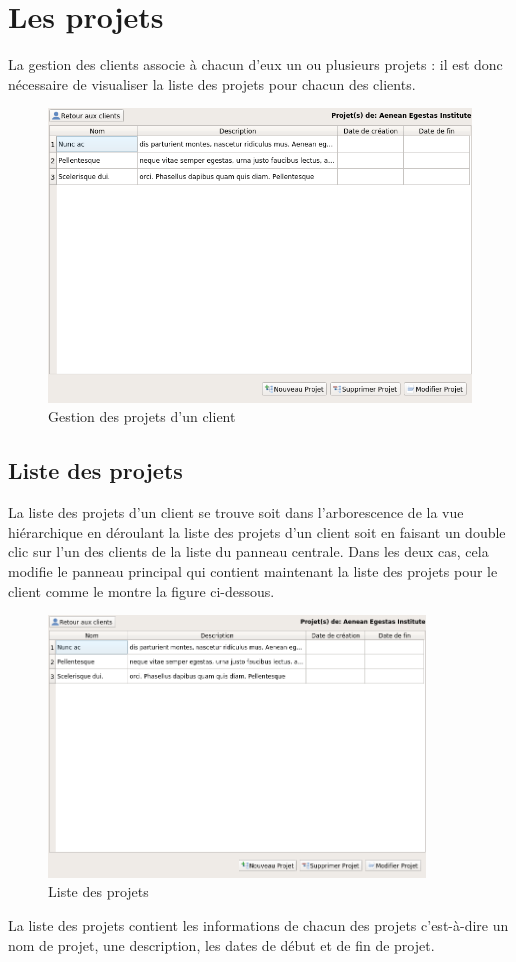 \chapter{Les projets}
La gestion des clients associe à chacun d'eux un ou plusieurs projets : il est donc nécessaire de visualiser la liste des projets pour chacun des clients. 
\begin{figure}[H]
	\centering
	\includegraphics[width=12cm]{screens/projets.png}
	\caption{Gestion des projets d'un client}
\end{figure}

\section{Liste des projets}
La liste des projets d'un client se trouve soit dans l'arborescence de la vue hiérarchique en déroulant la liste des projets d'un client soit en faisant un double clic sur l'un des clients de la liste du panneau centrale. Dans les deux cas, cela modifie le panneau principal qui contient maintenant la liste des projets pour le client comme le montre la figure ci-dessous.
\begin{figure}[H]
	\centering
	\includegraphics[width=10cm]{screens/projets.png}
	\caption{Liste des projets}
\end{figure}
La liste des projets contient les informations de chacun des projets c'est-à-dire un nom de projet, une description, les dates de début et de fin de projet. 

